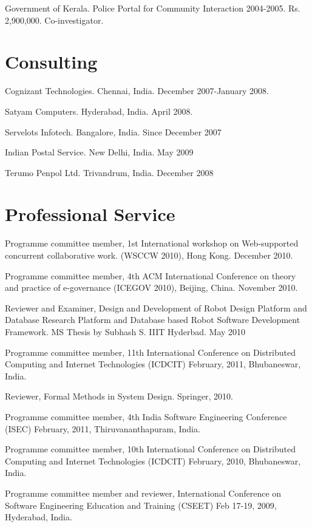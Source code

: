 \documentclass[11pt,margin,line]{res}
\begin{document}
\begin{resume}
Government of Kerala.  Police Portal for Community
Interaction 2004-2005.  Rs. 2,900,000.  Co-investigator.

\section{\sc Consulting}

Cognizant Technologies.  Chennai, India.  December
2007-January 2008.

Satyam Computers.  Hyderabad, India.  April 2008.

Servelots Infotech.  Bangalore, India.  Since December 2007

Indian Postal Service.   New Delhi, India.  May 2009

Terumo Penpol Ltd.  Trivandrum, India.  December 2008

\vspace{2em}

\section{\sc Professional Service}

Programme committee member, 1st International workshop on
Web-supported concurrent collaborative work.  (WSCCW 2010),
Hong Kong.  December 2010.

Programme committee member, 4th ACM International Conference
on theory and practice of e-governance (ICEGOV 2010),
Beijing, China.  November 2010.

Reviewer and Examiner, Design and Development of Robot
Design Platform and Database Research Platform and Database
based Robot Software Development Framework.  MS Thesis by
Subhash S. IIIT Hyderbad.  May 2010

Programme committee member, 11th International Conference on
Distributed Computing and Internet Technologies (ICDCIT)
February, 2011, Bhubaneswar, India.

Reviewer,  Formal Methods in System Design.  Springer, 2010.

Programme committee member, 4th India Software Engineering
Conference (ISEC) February, 2011, Thiruvananthapuram, India.

Programme committee member, 10th International Conference on
Distributed Computing and Internet Technologies (ICDCIT)
February, 2010, Bhubaneswar, India.

Programme committee member and reviewer, International
Conference on Software Engineering Education and Training
(CSEET) Feb 17-19, 2009, Hyderabad, India.


\end{resume}
\end{document}
